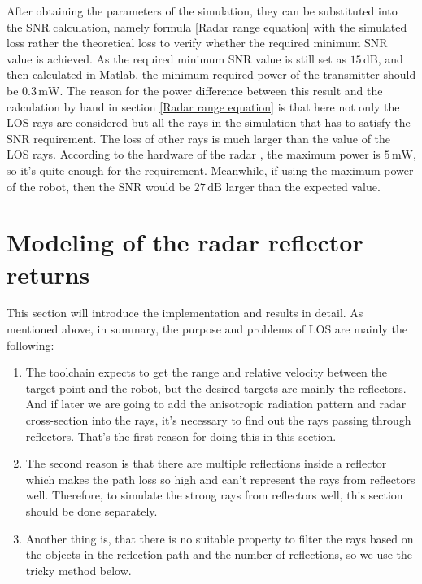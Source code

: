 \documentclass[12pt,DIV14,BCOR12mm,a4paper,footinclude=false,headinclude,parskip=half-,twoside,openright,cleardoublepage=empty,toc=index,bibliography=totoc,listof=totoc]{scrreprt}
\numberwithin{equation}{chapter}
\begin{document}
After obtaining the parameters of the simulation, they can be substituted into the SNR calculation, namely formula \ref{Radar range equation} with the simulated loss rather the theoretical loss to verify whether the required minimum SNR value is achieved. As the required minimum SNR value is still set as $15\,\mathrm{dB}$, and then calculated in Matlab, the minimum required power of the transmitter should be $0.3\,\mathrm{mW}$. The reason for the power difference between this result and the calculation by hand in section \ref{Radar range equation} is that here not only the LOS rays are considered but all the rays in the simulation that has to satisfy the SNR requirement. The loss of other rays is much larger than the value of the LOS rays. According to the hardware of the radar \cite{datasheet}, the maximum power is $5\,\mathrm{mW}$, so it's quite enough for the requirement. Meanwhile, if using the maximum power of the robot, then the SNR would be $27\,\mathrm{dB}$ larger than the expected value.

\section{Modeling of the radar reflector returns} \label{Modeling of the radar reflector returns}
This section will introduce the implementation and results in detail. As mentioned above, in summary, the purpose and problems of LOS are mainly the following:

\begin{enumerate}[label=\textbullet]
    \item The toolchain expects to get the range and relative velocity between the target point and the robot, but the desired targets are mainly the reflectors. And if later we are going to add the anisotropic radiation pattern and radar cross-section into the rays, it's necessary to find out the rays passing through reflectors. That's the first reason for doing this in this section.

    \item The second reason is that there are multiple reflections inside a reflector which makes the path loss so high and can't represent the rays from reflectors well. Therefore, to simulate the strong rays from reflectors well, this section should be done separately.

    \item Another thing is, that there is no suitable property to filter the rays based on the objects in the reflection path and the number of reflections, so we use the tricky method below.
\end{enumerate}
\end{document}
